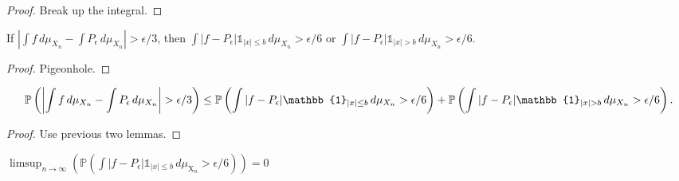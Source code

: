 \begin{proof}
  \notready
  Break up the integral.
\end{proof}


\begin{lemma}
  \label{lem:f_p_epsilon_pigeonhole}
  \uses{}
  \notready
  If $\left|\int f\,d\mu_{X_n} - \int P_\epsilon\,d\mu_{X_n}\right|>\epsilon/3$, then $\int |f-P_\epsilon|\mathbb{1}_{|x|\le b}\,d\mu_{X_n}>\epsilon/6$ or $\int |f-P_\epsilon|\mathbb{1}_{|x|> b}\,d\mu_{X_n}>\epsilon/6$.
  
\end{lemma}

\begin{proof}
  \notready
  Pigeonhole.
\end{proof}


\begin{lemma}
  \label{lem:f_p_epsilon_probability_inequality}
  \notready
  \[
    \bP\left(\left|\int f\,d\mu_{X_n} - \int P_\epsilon\,d\mu_{X_n}\right|>\epsilon/3\right) \le \bP\left(\int |f-P_\epsilon|\mathbb{1}_{|x|\le b}\,d\mu_{X_n}>\epsilon/6\right)
  + \bP\left(\int |f-P_\epsilon|\mathbb{1}_{|x|> b}\,d\mu_{X_n}>\epsilon/6\right).
  \]
  
\end{lemma}

\begin{proof}
  \notready
  Use previous two lemmas.
\end{proof}




\begin{lemma}
    \label{lem:first_term_of_first_term_zero}
    \notready
    $  \limsup_{n\to\infty} \left(\mathbb{P}\left(\int |f-P_\epsilon|\mathbb{1}_{|x|\le b}\,d\mu_{\mathrm{X}_n}>\epsilon/6\right) \right) = 0$
\end{lemma}



